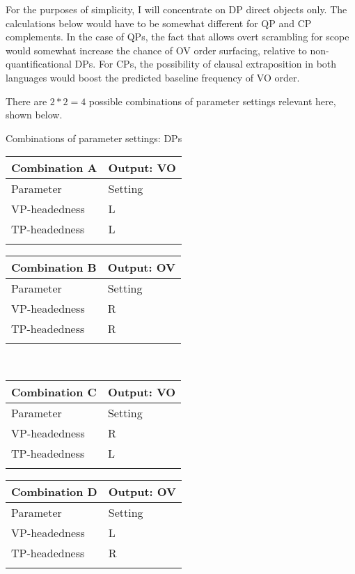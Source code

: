 \documentclass[output=paper]{langsci/langscibook}
\begin{document}
For the purposes of simplicity, I will concentrate on DP direct objects only.
The calculations below would have to be somewhat different for QP and CP
complements.  In the case of QPs, the fact that  allows overt scrambling
for scope would somewhat increase the chance of OV order surfacing, relative to
non-quantificational DPs.  For CPs, the possibility of clausal extraposition in
both languages would boost the predicted baseline frequency of VO order.

There are $2*2=4$ possible combinations of parameter settings relevant here,
shown below.

\ea\label{bkm:Ref341539124}Combinations of parameter settings: DPs\\
    \begin{tabularx}{.4\textwidth}{ll}
    \lsptoprule
    Combination A & Output: VO\\
    \midrule
    Parameter     & Setting\\
    VP-headedness & L\\
    TP-headedness & L\\
    \lspbottomrule
    \end{tabularx}
    \quad
    \begin{tabularx}{.4\textwidth}{ll}
    \lsptoprule
    Combination B & Output: OV\\
    \midrule
    Parameter     & Setting\\
    VP-headedness & R\\
    TP-headedness & R\\
    \lspbottomrule
    \end{tabularx}\\
    \begin{tabularx}{.4\textwidth}{ll}
    \lsptoprule
    Combination C & Output: VO\\
    \midrule
    Parameter     & Setting\\
    VP-headedness & R\\
    TP-headedness & L\\
    \lspbottomrule
    \end{tabularx}
    \quad
    \begin{tabularx}{.4\textwidth}{ll}
    \lsptoprule
    Combination D & Output: OV\\
    \midrule
    Parameter     & Setting\\
    VP-headedness & L\\
    TP-headedness & R\\
    \lspbottomrule
    \end{tabularx}
\z
\end{document}
